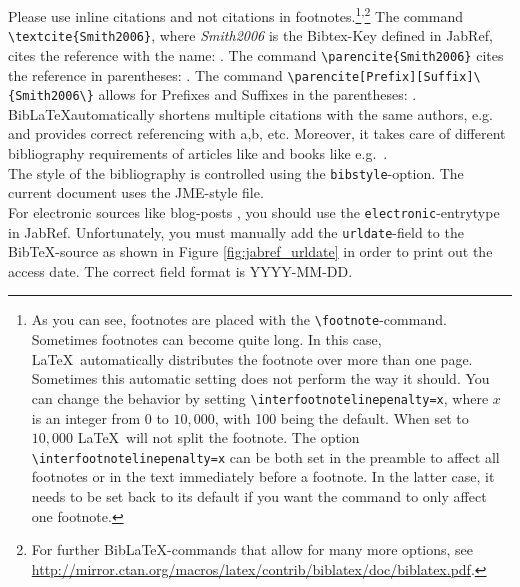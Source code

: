 \documentclass[a4paper,12pt]{scrartcl} %
\begin{document}
Please use inline citations and not citations in footnotes.\footnote{As you can see, footnotes are placed with the \texttt{\textbackslash footnote{}}-command. Sometimes footnotes can become quite long. In this case, \LaTeX\ automatically distributes the footnote over more than one page. Sometimes this automatic setting does not perform the way it should. You can change the behavior by setting \texttt{\textbackslash interfootnotelinepenalty=x}, where $x$ is an integer from $0$ to $10{,}000$, with 100 being the default. When set to $10{,}000$ \LaTeX\ will not split the footnote. The option \texttt{\textbackslash interfootnotelinepenalty=x} can be both set in the preamble to affect all footnotes or in the text immediately before a footnote. In the latter case, it needs to be set back to its default if you want the command to only affect one footnote.}\textsuperscript{,}\footnote{For further Bib\LaTeX-commands that allow for many more options, see \url{http://mirror.ctan.org/macros/latex/contrib/biblatex/doc/biblatex.pdf}.} The command \texttt{\textbackslash textcite\{Smith2006\}}, where \textit{Smith2006} is the Bibtex-Key defined in JabRef, cites the reference with the name: \textcite{Smith2006}. The command \texttt{\textbackslash parencite\{Smith2006\}} cites the reference in parentheses: \parencite{Smith2006}. The command \verb|\parencite[Prefix][Suffix]\{Smith2006\}| allows for Prefixes and Suffixes in the parentheses: \parencite[see e.g.][pp. 1-4]{Smith2006}.\\

Bib\LaTeX automatically shortens multiple citations with the same authors, e.g.\ \parencite{SGU2004JET,SGU2004,SGU2009,SGU2011} and provides correct referencing with a,b, etc. Moreover, it takes care of different bibliography requirements of articles like \textcite{SGU2004} and books like e.g.\ \textcite{SGU2005}.\\
The style of the bibliography is controlled using the \verb|bibstyle|-option. The current document uses the JME-style file.\\

For electronic sources like blog-posts \parencite[e.g.\ ][]{Krugman2012}, you should use the \texttt{electronic}-entrytype in JabRef. Unfortunately, you must manually add the \texttt{urldate}-field to the Bib\TeX-source as shown in Figure \ref{fig:jabref_urldate} in order to print out the access date. The correct field format is YYYY-MM-DD.
\end{document}
